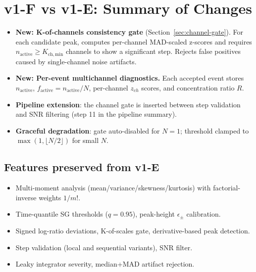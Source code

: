 \documentclass{article}
\begin{document}
\section{v1-F vs v1-E: Summary of Changes}

\begin{itemize}
  \item \textbf{New: K-of-channels consistency gate} (Section~\ref{sec:channel-gate}). For each
        candidate peak, computes per-channel MAD-scaled z-scores and requires
        $n_{\mathrm{active}} \ge K_{\mathrm{ch,min}}$ channels to show a significant step.
        Rejects false positives caused by single-channel noise artifacts.
  \item \textbf{New: Per-event multichannel diagnostics.} Each accepted event stores
        $n_{\mathrm{active}}$, $f_{\mathrm{active}} = n_{\mathrm{active}}/N$,
        per-channel $z_{ch}$ scores, and concentration ratio $R$.
  \item \textbf{Pipeline extension}: the channel gate is inserted between step validation and
        SNR filtering (step 11 in the pipeline summary).
  \item \textbf{Graceful degradation}: gate auto-disabled for $N=1$; threshold clamped to
        $\max(1, \lfloor N/2\rfloor)$ for small $N$.
\end{itemize}

\subsection{Features preserved from v1-E}
\begin{itemize}
  \item Multi-moment analysis (mean/variance/skewness/kurtosis) with factorial-inverse weights $1/m!$.
  \item Time-quantile SG thresholds ($q = 0.95$), peak-height $\epsilon_{\pm}$ calibration.
  \item Signed log-ratio deviations, K-of-scales gate, derivative-based peak detection.
  \item Step validation (local and sequential variants), SNR filter.
  \item Leaky integrator severity, median+MAD artifact rejection.
\end{itemize}
\end{document}
